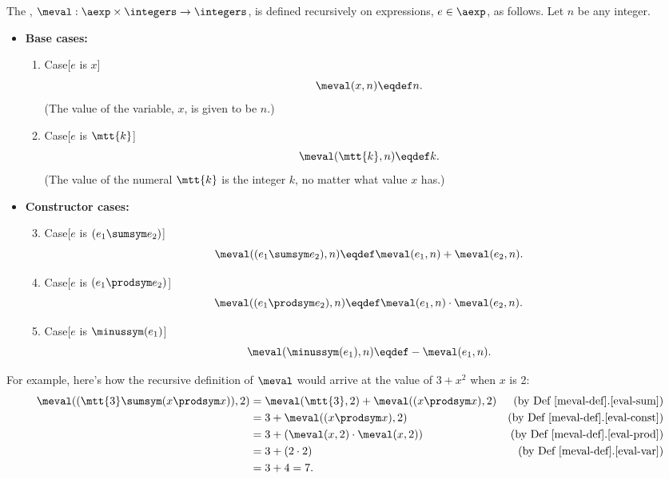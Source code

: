 \begin{definition}
\begin{definition}\label{meval-def}
  The , $\meval: \aexp \times \integers \to
  \integers$, is defined recursively on expressions, $e \in \aexp$, as
  follows.  Let $n$ be any integer.

\begin{itemize}
\item \textbf{Base cases:}

\begin{enumerate}

\item\label{eval-var} Case[$e$ is $x$]
\[
\meval(x, n) \eqdef n.
\]
(The value of the variable, $x$, is given to be $n$.)

\item\label{eval-const} Case[$e$ is $\mtt{k}$]
\[
\meval(\mtt{k}, n) \eqdef k.
\]
(The value of the numeral $\mtt{k}$ is the integer $k$, no matter what
value $x$ has.)

\end{enumerate}

\item \textbf{Constructor cases:}

\begin{enumerate}
\setcounter{enumi}{2}

\item\label{eval-sum} Case[$e$ is $(e_1 \sumsym e_2)$]
\[
\meval((e_1 \sumsym e_2),n) \eqdef
  \meval(e_1,n)+\meval(e_2,n).
\]

\item\label{eval-prod} Case[$e$ is $(e_1 \prodsym e_2)$]
\[
\meval((e_1 \prodsym e_2),n) \eqdef \meval(e_1,n) \cdot \meval(e_2,n).
\]

\item\label{eval-minus} Case[$e$ is $\minussym(e_1)$]
\[
\meval(\minussym(e_1),n) \eqdef - \meval(e_1,n).
\]
\end{enumerate}

\end{itemize}

\end{definition}

For example, here's how the recursive definition of $\meval$ would arrive at
the value of $3+x^2$ when $x$ is 2:
\begin{align*}
\meval((\mtt{3} \sumsym (x \prodsym x)),2)
 & = \meval(\mtt{3},2) + \meval((x \prodsym x),2)
                  & \text{(by~Def~\ref{meval-def}.\ref{eval-sum})}\\
 & = 3 + \meval((x \prodsym x),2) & \text{(by~Def~\ref{meval-def}.\ref{eval-const})}\\
 & = 3 + (\meval(x,2) \cdot \meval(x,2)) & \text{(by~Def~\ref{meval-def}.\ref{eval-prod})}\\
 & = 3 + (2 \cdot 2) & \text{(by~Def~\ref{meval-def}.\ref{eval-var})}\\
 & = 3 + 4 = 7.
\end{align*}


\end{definition}
